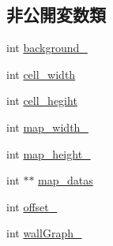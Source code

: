 \subsection*{非公開変数類}
\begin{DoxyCompactItemize}
\item 
int \hyperlink{class_map_aa03af329a40b2dbb4252f0a27243dcac}{background\+\_\+}
\item 
int \hyperlink{class_map_a9a14e00ff8843f4eed904f0dbe4b19dd}{cell\+\_\+width}
\item 
int \hyperlink{class_map_ad4c7bd28ec6d1b2e1e996686d5634bbc}{cell\+\_\+hegiht}
\item 
int \hyperlink{class_map_a1c47ff15c93974ddf3ef05f7bdee1571}{map\+\_\+width\+\_\+}
\item 
int \hyperlink{class_map_aaf4efb5b983ca1c0ec7e987711f57640}{map\+\_\+height\+\_\+}
\item 
int $\ast$$\ast$ \hyperlink{class_map_aebd3aa405509dae6a3a63edad08eaf63}{map\+\_\+datas}
\item 
int \hyperlink{class_map_a02557959c8b2b59592b673a356424e63}{offset\+\_\+}
\item 
int \hyperlink{class_map_a3d03c3930a3d2d4c9d7609ae46a730ea}{wall\+Graph\+\_\+}
\end{DoxyCompactItemize}


